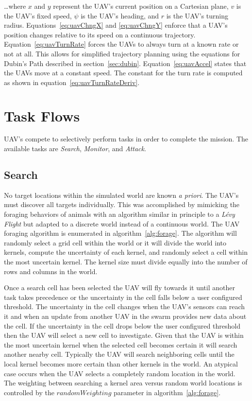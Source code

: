 \dots where $x$ and $y$ represent the UAV's current position on a Cartesian plane, $v$ is the UAV's fixed speed, $\psi$ is the UAV's heading, and $r$ is the UAV's turning radius.  Equations~\ref{eq:uavChngX} and \ref{eq:uavChngY} enforce that a UAV's position changes relative to its speed on a continuous trajectory.  Equation~\ref{eq:uavTurnRate} forces the UAVs to always turn at a known rate or not at all.  This allows for simplified trajectory planning using the equations for Dubin's Path described in section~\ref{sec:dubin}.  Equation~\ref{eq:uavAccel} states that the UAVs move at a constant speed.  The constant for the turn rate is computed as shown in equation~\ref{eq:uavTurnRateDeriv}.






\section{Task Flows}
UAV's compete to selectively perform tasks in order to complete the mission.  The available tasks are \textit{Search}, \textit{Monitor}, and \textit{Attack}.

\subsection{Search}
No target locations within the simulated world are known \textit{a priori}.  The UAV's must discover all targets individually.  This was accomplished by mimicking the foraging behaviors of animals with an algorithm similar in principle to a \textit{L\'evy Flight} but adapted to a discrete world instead of a continuous world.   The UAV foraging algorithm is enumerated in algorithm~\ref{alg:forage}.  The algorithm will randomly select a grid cell within the world or it will divide the world into kernels, compute the uncertainty of each kernel, and randomly select a cell within the most uncertain kernel.  The kernel size must divide equally into the number of rows and columns in the world.

Once a search cell has been selected the UAV will fly towards it until another task takes precedence or the uncertainty in the cell falls below a user configured threshold.  The uncertainty in the cell changes when the UAV's sensors can reach it and when an update from another UAV in the swarm provides new data about the cell. If the uncertainty in the cell drops below the user configured threshold then the UAV will select a new cell to investigate.  Given that the UAV is within the most uncertain kernel when the selected cell becomes certain it will search another nearby cell.  Typically the UAV will search neighboring cells until the local kernel becomes more certain than other kernels in the world.  An atypical case occurs when the UAV selects a completely random location in the world.  The weighting between searching a kernel area versus random world locations is controlled by the $randomWeighting$ parameter in algorithm~\ref{alg:forage}.

